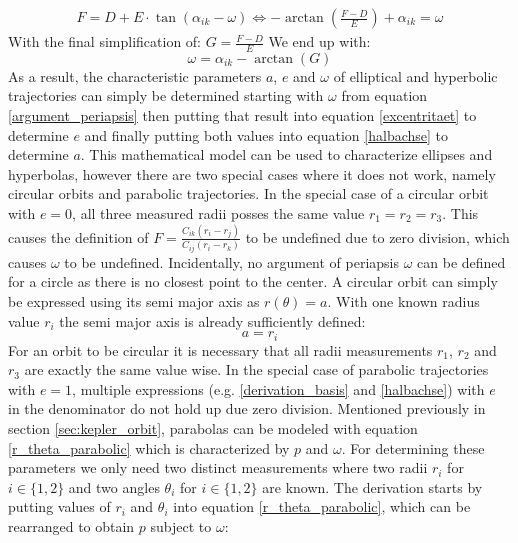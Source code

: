\documentclass[11pt,a4paper]{article}
\begin{document}
	\begin{equation*}
		\begin{aligned}
			F=D+E\cdot\tan(\alpha_{ik}-\omega) \Leftrightarrow -\arctan\left(\frac{F-D}{E}\right)+\alpha_{ik}=\omega
		\end{aligned}
	\end{equation*}\noindent
	With the final simplification of: \newline
	$G=\frac{F-D}{E}$\newline
	We end up with:\newline
	\begin{equation}\label{argument_periapsis}
		\boxed{\omega=\alpha_{ik}-\arctan(G)}
	\end{equation}
	\noindent
	As a result, the characteristic parameters $a$, $e$ and $\omega$ of elliptical and hyperbolic trajectories can simply be determined starting with $\omega$ from equation \ref{argument_periapsis} then putting that result into equation \ref{excentritaet} to determine $e$ and finally putting both values into equation \ref{halbachse} to determine $a$.\newline
	This mathematical model can be used to characterize ellipses and hyperbolas, however there are two special cases where it does not work, namely circular orbits and parabolic trajectories. In the special case of a circular orbit with $e=0$, all three measured radii posses the same value $r_1=r_2=r_3$. This causes the definition of $F=\frac{C_{ik}(r_i-r_j)}{C_{ij}(r_i-r_k)}$ to be undefined due to zero division, which causes $\omega$ to be undefined. Incidentally, no argument of periapsis $\omega$ can be defined for a circle as there is no closest point to the center. A circular orbit can simply be expressed using its semi major axis as $r(\theta)=a$. With one known radius value $r_i$ the semi major axis is already sufficiently defined:
	\begin{equation}
		\label{ein_langweiliger_kreis}
		\boxed{a=r_i}
	\end{equation}
	For an orbit to be circular it is necessary that all radii measurements $r_1$, $r_2$ and $r_3$ are exactly the same value wise.\newline
	In the special case of parabolic trajectories with $e=1$, multiple expressions (e.g. \ref{derivation_basis} and \ref{halbachse}) with $e$ in the denominator do not hold up due zero division. Mentioned previously in section \ref{sec:kepler_orbit}, parabolas can be modeled with equation \ref{r_theta_parabolic} which is characterized by $p$ and $\omega$. For determining these parameters we only need two distinct measurements where two radii $r_i$ for $i \in \{1,2\}$ and two angles $\theta_i$ for $i \in \{1,2\}$ are known. The derivation starts by putting values of $r_i$ and $\theta_i$ into equation \ref{r_theta_parabolic}, which can be rearranged to obtain $p$ subject to $\omega$:
\end{document}
